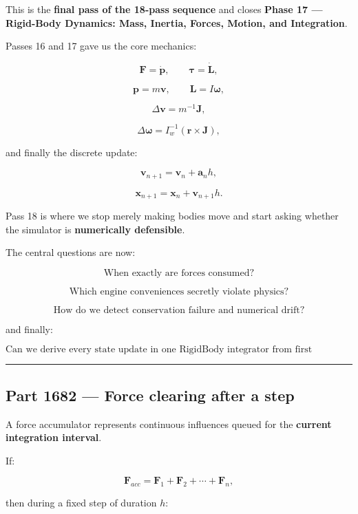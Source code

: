 This is the \textbf{final pass of the 18-pass sequence} and closes \textbf{Phase 17 --- Rigid-Body Dynamics: Mass, Inertia, Forces, Motion, and Integration}.

Passes 16 and 17 gave us the core mechanics:

\[
\mathbf F=\dot{\mathbf p},
\qquad
\boldsymbol\tau=\dot{\mathbf L},
\]

\[
\mathbf p=m\mathbf v,
\qquad
\mathbf L=I\boldsymbol\omega,
\]

\[
\Delta \mathbf v=m^{-1}\mathbf J,
\]

\[
\Delta\boldsymbol\omega
=
I_w^{-1}
(\mathbf r\times\mathbf J),
\]

and finally the discrete update:

\[
\mathbf v_{n+1}
=
\mathbf v_n+\mathbf a_nh,
\]

\[
\mathbf x_{n+1}
=
\mathbf x_n+\mathbf v_{n+1}h.
\]

Pass 18 is where we stop merely making bodies move and start asking whether the simulator is \textbf{numerically defensible}.

The central questions are now:

\[
\boxed{
\text{When exactly are forces consumed?}
}
\]

\[
\boxed{
\text{Which engine conveniences secretly violate physics?}
}
\]

\[
\boxed{
\text{How do we detect conservation failure and numerical drift?}
}
\]

and finally:

\[
\boxed{
\text{Can we derive every state update in one RigidBody integrator from first principles?}
}
\]

\begin{center}\rule{0.5\linewidth}{0.5pt}\end{center}

\subsection{Part 1682 --- Force clearing after a step}\label{06-engine-ii-ch038-part-1682-force-clearing-after-a-step}

A force accumulator represents continuous influences queued for the \textbf{current integration interval}.

If:

\[
\mathbf F_{acc}
=
\mathbf F_1+\mathbf F_2+\cdots+\mathbf F_n,
\]

then during a fixed step of duration \(h\):

